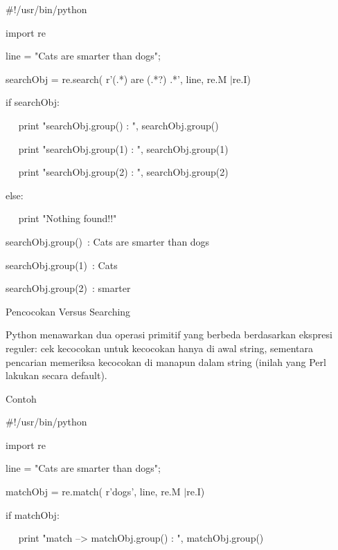 \begin {enumerate}
\vspace{12pt}
\vspace{12pt}
\noindent 
 $  \#  $!/usr/bin/python \par
\noindent 
import re \par
\vspace{12pt}
\noindent 
line = "Cats are smarter than dogs"; \par
\vspace{12pt}
\noindent 
searchObj = re.search( r'(.*) are (.*?) .*', line, re.M $  \vert  $re.I) \par
\vspace{12pt}
\noindent 
if searchObj: \par
\noindent 
~~ print "searchObj.group() : ", searchObj.group() \par
\noindent 
~~ print "searchObj.group(1) : ", searchObj.group(1) \par
\noindent 
~~ print "searchObj.group(2) : ", searchObj.group(2) \par
\noindent 
else: \par
\noindent 
~~ print "Nothing found!!" \par
\vspace{12pt}
\noindent 
searchObj.group()~:  Cats are smarter than dogs \par
\noindent 
searchObj.group(1)~:  Cats \par
\noindent 
searchObj.group(2)~:  smarter \par
\noindent 
Pencocokan Versus Searching \par
\vspace{12pt}
Python menawarkan dua operasi primitif yang berbeda berdasarkan ekspresi reguler: cek kecocokan untuk kecocokan hanya di awal string, sementara pencarian memeriksa kecocokan di manapun dalam string (inilah yang Perl lakukan secara default). \par
Contoh \par
\noindent 
 $  \#  $!/usr/bin/python \par
\noindent 
import re \par
\vspace{12pt}
\noindent 
line = "Cats are smarter than dogs"; \par
\vspace{12pt}
\noindent 
matchObj = re.match( r'dogs', line, re.M $  \vert  $re.I) \par
\noindent 
if matchObj: \par
\noindent 
~~ print "match --> matchObj.group() : ", matchObj.group() \par

\end{enumerate}
